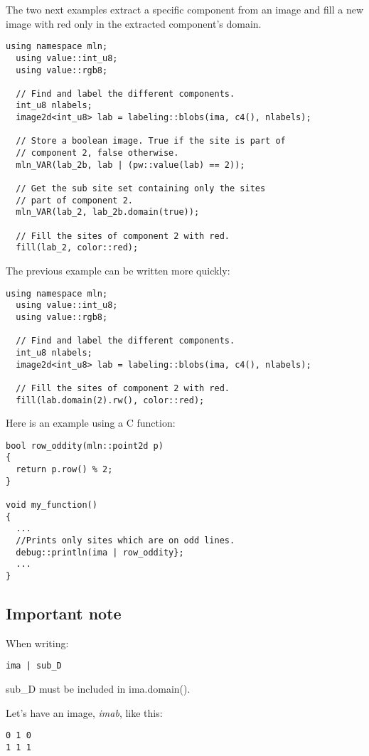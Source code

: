 \documentclass{report}
\begin{document}
The two next examples extract a specific component from an image and fill a new
image with red only in the extracted component's domain.
\begin{lstlisting}[frame=single]
  using namespace mln;
  using value::int_u8;
  using value::rgb8;

  // Find and label the different components.
  int_u8 nlabels;
  image2d<int_u8> lab = labeling::blobs(ima, c4(), nlabels);

  // Store a boolean image. True if the site is part of
  // component 2, false otherwise.
  mln_VAR(lab_2b, lab | (pw::value(lab) == 2));

  // Get the sub site set containing only the sites
  // part of component 2.
  mln_VAR(lab_2, lab_2b.domain(true));

  // Fill the sites of component 2 with red.
  fill(lab_2, color::red);
\end{lstlisting}

The previous example can be written more quickly:
\begin{lstlisting}[frame=single]
  using namespace mln;
  using value::int_u8;
  using value::rgb8;

  // Find and label the different components.
  int_u8 nlabels;
  image2d<int_u8> lab = labeling::blobs(ima, c4(), nlabels);

  // Fill the sites of component 2 with red.
  fill(lab.domain(2).rw(), color::red);
\end{lstlisting}

Here is an example using a C function:
\begin{lstlisting}[frame=single]
bool row_oddity(mln::point2d p)
{
  return p.row() % 2;
}

void my_function()
{
  ...
  //Prints only sites which are on odd lines.
  debug::println(ima | row_oddity};
  ...
}
\end{lstlisting}
%
%
\medskip
%
%
\subsection*{Important note}
When writing:

\begin{lstlisting}[frame=single]
  ima | sub_D
\end{lstlisting}

sub\_D must be included in ima.domain().

Let's have an image, \textit{imab}, like this:
\begin{lstlisting}[frame=single]
0 1 0
1 1 1
\end{lstlisting}
\end{document}
